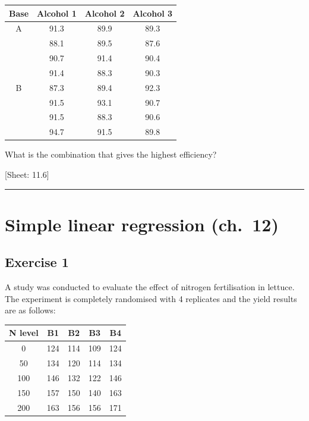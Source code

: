 \documentclass[a4paper,12pt,oneside]{book}
\begin{document}
\begin{longtable}[]{@{}cccc@{}}
\toprule()
Base & Alcohol 1 & Alcohol 2 & Alcohol 3 \\
\midrule()
\endhead
A & 91.3 & 89.9 & 89.3 \\
& 88.1 & 89.5 & 87.6 \\
& 90.7 & 91.4 & 90.4 \\
& 91.4 & 88.3 & 90.3 \\
B & 87.3 & 89.4 & 92.3 \\
& 91.5 & 93.1 & 90.7 \\
& 91.5 & 88.3 & 90.6 \\
& 94.7 & 91.5 & 89.8 \\
\bottomrule()
\end{longtable}

What is the combination that gives the highest efficiency?

{[}Sheet: 11.6{]}

\begin{center}\rule{0.5\linewidth}{0.5pt}\end{center}

\hypertarget{simple-linear-regression-ch.-12}{%
\section{Simple linear regression (ch.~12)}\label{simple-linear-regression-ch.-12}}

\hypertarget{exercise-1-8}{%
\subsection{Exercise 1}\label{exercise-1-8}}

A study was conducted to evaluate the effect of nitrogen fertilisation in lettuce. The experiment is completely randomised with 4 replicates and the yield results are as follows:

\begin{longtable}[]{@{}ccccc@{}}
\toprule()
N level & B1 & B2 & B3 & B4 \\
\midrule()
\endhead
0 & 124 & 114 & 109 & 124 \\
50 & 134 & 120 & 114 & 134 \\
100 & 146 & 132 & 122 & 146 \\
150 & 157 & 150 & 140 & 163 \\
200 & 163 & 156 & 156 & 171 \\
\bottomrule()
\end{longtable}
\end{document}
